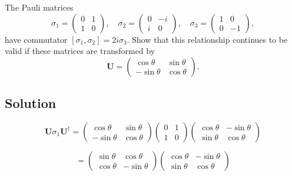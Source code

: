 \documentclass[12pt]{article}
\begin{document}
The Pauli matrices
\[
    \sigma_1=\left(\begin{array}{ll}
            0 & 1 \\
            1 & 0
        \end{array}\right), \quad \sigma_2=\left(\begin{array}{cc}
            0 & -i \\
            i & 0
        \end{array}\right), \quad \sigma_3=\left(\begin{array}{rr}
            1 & 0  \\
            0 & -1
        \end{array}\right),
\]
have commutator \(\left[\sigma_1, \sigma_2\right]=2 i \sigma_3\). Show that this relationship continues to be valid if these matrices are transformed by
\[
    \mathbf{U}=\left(\begin{array}{rr}
            \cos \theta  & \sin \theta \\
            -\sin \theta & \cos \theta
        \end{array}\right) .
\]

\subsection{Solution}

\[
    \mathbf{U}\sigma_1\mathbf{U^\dagger} =
    \begin{pmatrix}
        \cos \theta  & \sin \theta \\
        -\sin \theta & \cos \theta
    \end{pmatrix}
    \begin{pmatrix}
        0 & 1 \\
        1 & 0
    \end{pmatrix}
    \begin{pmatrix}
        \cos \theta & -\sin \theta \\
        \sin \theta & \cos \theta
    \end{pmatrix}
\]

\[
    =
    \begin{pmatrix}
        \sin \theta & \cos \theta  \\
        \cos \theta & -\sin \theta
    \end{pmatrix}
    \begin{pmatrix}
        \cos \theta & -\sin \theta \\
        \sin \theta & \cos \theta
    \end{pmatrix}
\]
\end{document}
